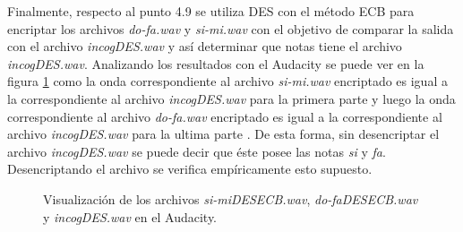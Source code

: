 \documentclass[a4paper,10pt]{article}
\begin{document}
Finalmente, respecto al punto 4.9 se utiliza DES con el m\'etodo ECB para encriptar
los archivos \emph{do-fa.wav} y \emph{si-mi.wav} con el objetivo de comparar la salida
con el archivo \emph{incogDES.wav} y as\'i determinar que notas tiene el archivo
\emph{incogDES.wav}. Analizando los resultados con el Audacity se puede ver en la figura
\ref{fig:DESAudacityCmp} como la onda correspondiente al archivo \emph{si-mi.wav} encriptado
es igual a la correspondiente al archivo \emph{incogDES.wav} para la primera parte y luego 
la onda correspondiente al archivo \emph{do-fa.wav} encriptado
es igual a la correspondiente al archivo \emph{incogDES.wav} para la ultima parte . De esta forma,
sin desencriptar
el archivo \emph{incogDES.wav} se puede decir que \'este posee las notas \emph{si} y \emph{fa}.
Desencriptando el archivo se verifica empíricamente esto supuesto.
\begin{figure}
	\begin{center}
	\end{center}
	\caption{Visualización de los archivos \emph{si-miDESECB.wav}, \emph{do-faDESECB.wav} y
		\emph{incogDES.wav} en el Audacity.}
	\label{fig:DESAudacityCmp}
\end{figure}
\end{document}

